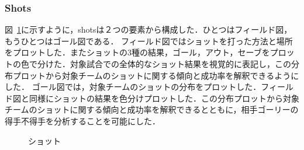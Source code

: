 \documentclass[sotsuron]{kuee}
\begin{document}
			\subsubsection{Shots}
				図~\ref{fig:shots}に示すように，shotsは２つの要素から構成した．ひとつはフィールド図，もうひとつはゴール図である．
				フィールド図ではショットを打った方法と場所をプロットした．またショットの3種の結果，ゴール，アウト，セーブをプロットの色で分けた．対象試合での全体的なショット結果を視覚的に表記し，この分布プロットから対象チームのショットに関する傾向と成功率を解釈できるようにした．
				ゴール図では，対象チームのショットの分布をプロットした．フィールド図と同様にショットの結果を色分けプロットした．この分布プロットから対象チームのショットに関する傾向と成功率を解釈できるとともに，相手ゴーリーの得手不得手を分析することを可能にした．
					\begin{figure}
						\begin{center}
						\end{center}
						\caption{ショット}
				  		\label{fig:shots}
					\end{figure}
\end{document}
